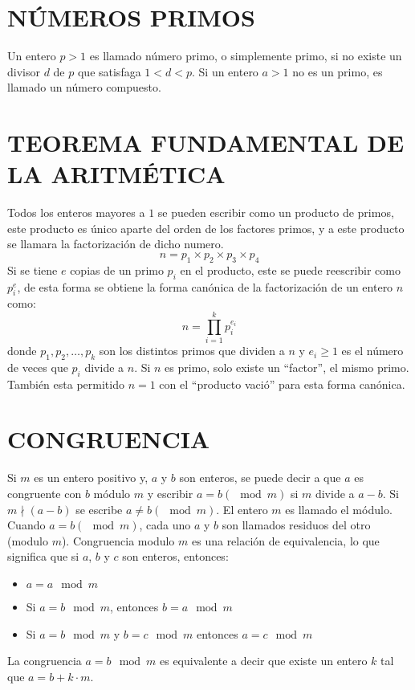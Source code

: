     \section{NÚMEROS PRIMOS}
    Un entero $p > 1$ es llamado número primo, o simplemente primo, si no existe un divisor $d$ de $p$ que satisfaga $1 < d < p$. Si un entero $a > 1$ no es un primo, es llamado un número compuesto.

    \section{TEOREMA FUNDAMENTAL DE LA ARITMÉTICA}
    Todos los enteros mayores a $1$ se pueden escribir como un producto de primos, este producto es único aparte del orden de los factores primos, y a este producto se llamara la factorización de dicho numero.
    \[
        n = p_{1} \times p_{2} \times p_{3} \times p_{4}
    \]
    Si se tiene $e$ copias de un primo $p_{i}$ en el producto, este se puede reescribir como $p_{i}^{e}$, de esta forma se obtiene la forma canónica de la factorización de un entero $n$ como:
    \[
        n = \prod_{i=1}^{k}p_{i}^{e_{i}}
    \]
    donde $p_{1}, p_{2},\dots, p_{k}$ son los distintos primos que dividen a $n$ y $e_{i} \geq 1$ es el número de veces que $p_{i}$ divide a $n$. Si $n$ es primo, solo existe un “factor”, el mismo primo. También esta permitido $n=1$ con el “producto vació” para esta forma canónica.
    
    \section{CONGRUENCIA}
    Si $m$ es un entero positivo y, $a$ y $b$ son enteros, se puede decir a que $a$ es congruente con $b$ módulo $m$ y escribir $a = b(\mod m)$ si $m$ divide a $a-b$. Si $m \nmid (a-b)$ se escribe $a \not = b(\mod m)$. El entero $m$ es llamado el módulo. Cuando $a = b (\mod m)$, cada uno $a$ y $b$ son llamados residuos del otro (modulo $m$). Congruencia modulo $m$ es una relación de equivalencia, lo que significa que si $a$, $b$ y $c$ son enteros, entonces:
    
    \begin{itemize}
        \item{$a = a \mod m$}
        \item{Si $a = b \mod m$, entonces $b = a \mod m$}
        \item{Si $a = b \mod m$ y $b = c \mod m$ entonces $a = c \mod m$}
    \end{itemize}
    La congruencia $a = b \mod m$ es equivalente a decir que existe un entero $k$ tal que $a = b + k\cdot m$.

